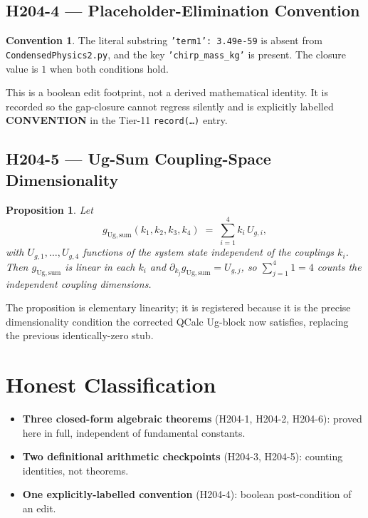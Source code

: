 \documentclass[11pt,letterpaper]{article}
\newtheorem{proposition}[theorem]{Proposition}
\theoremstyle{definition}
\newtheorem{convention}[theorem]{Convention}
\begin{document}
\subsection{H204-4 --- Placeholder-Elimination Convention}

\begin{convention}\label{conv:placeholder}
The literal substring \texttt{'term1':\ 3.49e-59} is absent from
\texttt{CondensedPhysics2.py}, and the key \texttt{'chirp\_mass\_kg'} is
present. The closure value is $1$ when both conditions hold.
\end{convention}

This is a boolean edit footprint, not a derived mathematical identity. It
is recorded so the gap-closure cannot regress silently and is explicitly
labelled \textbf{CONVENTION} in the Tier-11 \texttt{record(\ldots)} entry.

\subsection{H204-5 --- Ug-Sum Coupling-Space Dimensionality}

\begin{proposition}\label{prop:ug}
Let
\[
   g_{\mathrm{Ug,sum}}(k_1, k_2, k_3, k_4) \;=\; \sum_{i=1}^{4} k_i \, U_{g,i},
\]
with $U_{g,1}, \ldots, U_{g,4}$ functions of the system state independent
of the couplings $k_i$. Then $g_{\mathrm{Ug,sum}}$ is linear in each
$k_i$ and
$\partial_{k_j} g_{\mathrm{Ug,sum}} = U_{g,j}$, so
$\sum_{j=1}^{4} 1 = 4$ counts the independent coupling dimensions.
\end{proposition}

The proposition is elementary linearity; it is registered because it is
the precise dimensionality condition the corrected QCalc Ug-block now
satisfies, replacing the previous identically-zero stub.

\section{Honest Classification}

\begin{itemize}
\item \textbf{Three closed-form algebraic theorems} (H204-1, H204-2, H204-6):
      proved here in full, independent of fundamental constants.
\item \textbf{Two definitional arithmetic checkpoints} (H204-3, H204-5):
      counting identities, not theorems.
\item \textbf{One explicitly-labelled convention} (H204-4): boolean
      post-condition of an edit.
\end{itemize}
\end{document}
